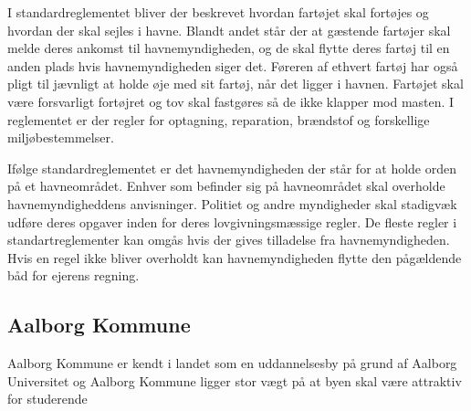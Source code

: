I standardreglementet bliver der beskrevet hvordan fartøjet skal fortøjes og hvordan der skal sejles i havne. Blandt andet står der at gæstende fartøjer skal melde deres ankomst til havnemyndigheden, og de skal flytte deres fartøj til en anden plads hvis havnemyndigheden siger det. Føreren af ethvert fartøj har også pligt til jævnligt at holde øje med sit fartøj, når det ligger i havnen. Fartøjet skal være forsvarligt fortøjret og tov skal fastgøres så de ikke klapper mod masten. I reglementet er der regler for optagning, reparation, brændstof og forskellige miljøbestemmelser.

Ifølge standardreglementet er det havnemyndigheden der står for at holde orden på et havneområdet. Enhver som befinder sig på havneområdet skal overholde havnemyndigheddens anvisninger. Politiet og andre myndigheder skal stadigvæk udføre deres opgaver inden for deres lovgivningsmæssige regler. De fleste regler i standartreglementer kan omgås hvis der gives tilladelse fra havnemyndigheden. Hvis en regel ikke bliver overholdt kan havnemyndigheden flytte den pågældende båd for ejerens regning.


\subsection{Aalborg Kommune}
Aalborg Kommune er kendt i landet som en uddannelsesby på grund af Aalborg Universitet og Aalborg Kommune ligger stor vægt på at byen skal være attraktiv for studerende \cite{udd-strat-aalborg}
